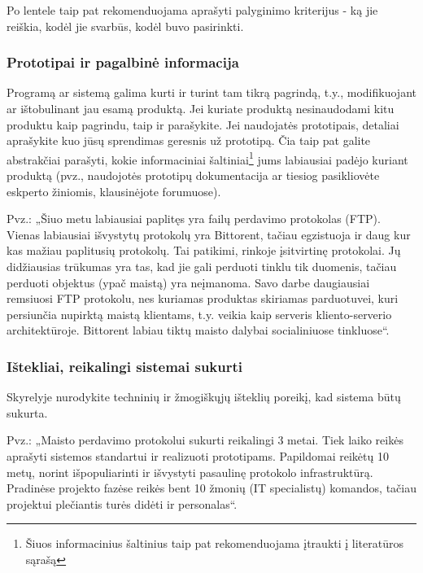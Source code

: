 \documentclass{ktuthesis}
\begin{document}
	
	Po lentele taip pat rekomenduojama aprašyti palyginimo kriterijus - ką jie reiškia, kodėl jie svarbūs, kodėl buvo pasirinkti.
	
	\subsubsection{Prototipai ir pagalbinė informacija}
	
	Programą ar sistemą galima kurti ir turint tam tikrą pagrindą, t.y., modifikuojant ar ištobulinant jau esamą produktą. Jei kuriate produktą nesinaudodami
	kitu produktu kaip pagrindu, taip ir parašykite. Jei naudojatės prototipais, detaliai aprašykite kuo jūsų sprendimas geresnis už prototipą. Čia taip pat
	galite abstrakčiai parašyti, kokie informaciniai šaltiniai\footnote[2]{Šiuos informacinius šaltinius taip pat rekomenduojama įtraukti į literatūros sąrašą}
	jums labiausiai padėjo kuriant produktą (pvz., naudojotės prototipų dokumentacija ar tiesiog pasikliovėte eskperto žiniomis, klausinėjote forumuose).
	
	Pvz.: „Šiuo metu labiausiai paplitęs yra failų perdavimo protokolas (FTP). Vienas labiausiai išvystytų protokolų yra Bittorent, tačiau egzistuoja ir daug kur kas
	mažiau paplitusių protokolų. Tai patikimi, rinkoje įsitvirtinę protokolai. Jų didžiausias trūkumas yra tas, kad jie gali perduoti tinklu tik duomenis,
	tačiau perduoti objektus (ypač maistą) yra neįmanoma. Savo darbe daugiausiai remsiuosi FTP protokolu, nes kuriamas produktas skiriamas parduotuvei, kuri
	persiunčia nupirktą maistą klientams, t.y. veikia kaip serveris kliento-serverio architektūroje. Bittorent labiau tiktų maisto dalybai socialiniuose tinkluose“.
	
	\subsubsection{Ištekliai, reikalingi sistemai sukurti}
	
	Skyrelyje nurodykite techninių ir žmogiškųjų išteklių poreikį, kad sistema būtų sukurta.
	
	Pvz.: „Maisto perdavimo protokolui sukurti reikalingi 3 metai. Tiek laiko reikės aprašyti sistemos standartui ir realizuoti prototipams. Papildomai reikėtų
	10 metų, norint išpopuliarinti ir išvystyti pasaulinę protokolo infrastruktūrą. Pradinėse projekto fazėse reikės bent 10 žmonių (IT specialistų) komandos,
	tačiau projektui plečiantis turės didėti ir personalas“.
	
\end{document}
